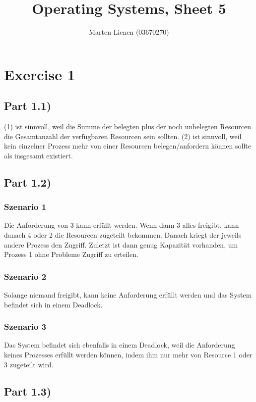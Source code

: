 \documentclass[10pt,a4paper]{article}
\title{Operating Systems, Sheet 5}
\author{Marten Lienen (03670270)}
\begin{document}
\maketitle

\section*{Exercise 1}

\subsection*{Part 1.1)}

(1) ist sinnvoll, weil die Summe der belegten plus der noch unbelegten Resourcen die Gesamtanzahl der verfügbaren Resourcen sein sollten.
(2) ist sinnvoll, weil kein einzelner Prozess mehr von einer Resourcen belegen/anfordern können sollte als insgesamt existiert.

\subsection*{Part 1.2)}

\subsubsection*{Szenario 1}

Die Anforderung von 3 kann erfüllt werden.
Wenn dann 3 alles freigibt, kann danach 4 oder 2 die Resourcen zugeteilt bekommen.
Danach kriegt der jeweils andere Prozess den Zugriff.
Zuletzt ist dann genug Kapazität vorhanden, um Prozess 1 ohne Probleme Zugriff zu erteilen.

\subsubsection*{Szenario 2}

Solange niemand freigibt, kann keine Anforderung erfüllt werden und das System befindet sich in einem Deadlock.

\subsubsection*{Szenario 3}

Das System befindet sich ebenfalls in einem Deadlock, weil die Anforderung keines Prozesses erfüllt werden können, indem ihm nur mehr von Resource 1 oder 3 zugeteilt wird.

\subsection*{Part 1.3)}
\end{document}
